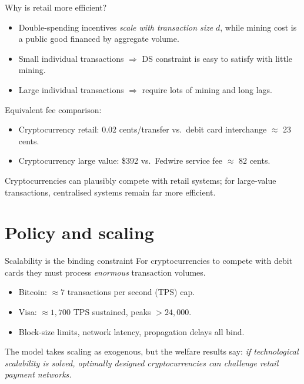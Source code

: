 \documentclass[aspectratio=169,xcolor=dvipsnames]{beamer}
\begin{document}
\begin{frame}{Why is retail more efficient?}
    \begin{itemize}
        \item Double-spending incentives \emph{scale with transaction size} $d$, while mining cost
              is a public good financed by aggregate volume.
        \item Small individual transactions $\Rightarrow$ DS constraint is easy to satisfy with little mining.
        \item Large individual transactions $\Rightarrow$ require lots of mining and long lags.
    \end{itemize}
    \vspace{3mm}
    Equivalent fee comparison:
    \begin{itemize}
        \item Cryptocurrency retail: 0.02 cents/transfer vs.\ debit card interchange $\approx$ 23 cents.
        \item Cryptocurrency large value: \$392 vs.\ Fedwire service fee $\approx$ 82 cents.
    \end{itemize}
    \vspace{3mm}
    Cryptocurrencies can plausibly compete with retail systems; for large-value
    transactions, centralised systems remain far more efficient.
\end{frame}

\section{Policy and scaling}

\begin{frame}{Scalability is the binding constraint}
    For cryptocurrencies to compete with debit cards they must process \emph{enormous} transaction
    volumes.
    \vspace{2mm}
    \begin{itemize}
        \item Bitcoin: $\approx 7$ transactions per second (TPS) cap.
        \item Visa: $\approx 1{,}700$ TPS sustained, peaks $> 24{,}000$.
        \item Block-size limits, network latency, propagation delays all bind.
    \end{itemize}
    \vspace{3mm}
    The model takes scaling as exogenous, but the welfare results say:
    \emph{if technological scalability is solved, optimally designed cryptocurrencies
    can challenge retail payment networks.}
\end{frame}
\end{document}
